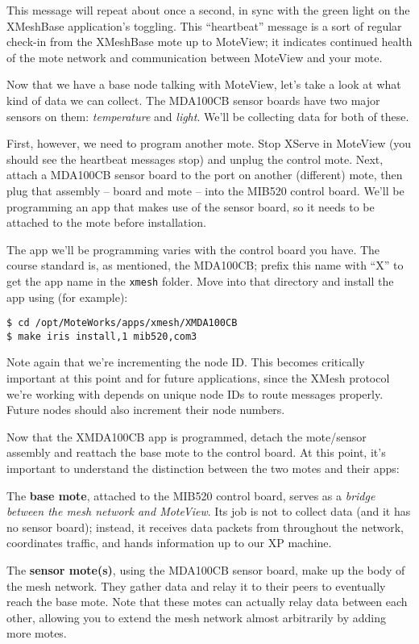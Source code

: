 \documentclass{article}
\begin{document}
This message will repeat about once a second, in sync with the green light on the XMeshBase application's toggling. This ``heartbeat'' message is a sort of regular check-in from the XMeshBase mote up to MoteView; it indicates continued health of the mote network and communication between MoteView and your mote.


Now that we have a base node talking with MoteView, let's take a look at what kind of data we can collect. The MDA100CB sensor boards have two major sensors on them: \textit{temperature} and \textit{light}. We'll be collecting data for both of these.

First, however, we need to program another mote. Stop XServe in MoteView (you should see the heartbeat messages stop) and unplug the control mote. Next, attach a MDA100CB sensor board to the port on another (different) mote, then plug that assembly -- board and mote -- into the MIB520 control board. We'll be programming an app that makes use of the sensor board, so it needs to be attached to the mote before installation.

The app we'll be programming varies with the control board you have. The course standard is, as mentioned, the MDA100CB; prefix this name with ``X'' to get the app name in the \verb!xmesh! folder. Move into that directory and install the app using (for example):

\begin{verbatim}
$ cd /opt/MoteWorks/apps/xmesh/XMDA100CB
$ make iris install,1 mib520,com3
\end{verbatim}

Note again that we're incrementing the node ID. This becomes critically important at this point and for future applications, since the XMesh protocol we're working with depends on unique node IDs to route messages properly. Future nodes should also increment their node numbers.

Now that the XMDA100CB app is programmed, detach the mote/sensor assembly and reattach the base mote to the control board. At this point, it's important to understand the distinction between the two motes and their apps:

\begin{itemize*}
\item The \textbf{base mote}, attached to the MIB520 control board, serves as a \textit{bridge between the mesh network and MoteView}. Its job is not to collect data (and it has no sensor board); instead, it receives data packets from throughout the network, coordinates traffic, and hands information up to our XP machine.
\item The \textbf{sensor mote(s)}, using the MDA100CB sensor board, make up the body of the mesh network. They gather data and relay it to their peers to eventually reach the base mote. Note that these motes can actually relay data between each other, allowing you to extend the mesh network almost arbitrarily by adding more motes.
\end{itemize*}
\end{document}
